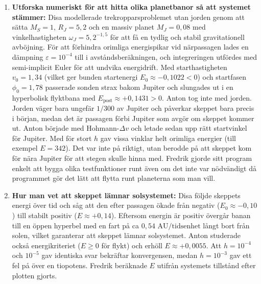 \documentclass{article}
\begin{document}
\begin{enumerate}
    \item \textbf{Utforska numeriskt för att hitta olika planetbanor så att systemet stämmer:} 
    Disa modellerade trekropparsproblemet utan jorden genom att sätta $M_S = 1$, $R_J = 5{,}2$ och en massiv planet $M_J = 0{,}08$ med vinkelhastigheten $\omega_J = 5{,}2^{-1{,}5}$ för att få en tydlig och stabil gravitationell avböjning. För att förhindra orimliga energispikar vid närpassagen lades en dämpning $\varepsilon = 10^{-4}$ till i avståndsberäkningen, och integreringen utfördes med semi-implicit Euler för att undvika energidrift. Med starthastigheten $v_0 = 1{,}34$ (vilket ger bunden startenergi $E_0 \approx -0{,}1022 < 0$) och startfasen $\phi_0 = 1{,}78$ passerade sonden strax bakom Jupiter och slungades ut i en hyperbolisk flyktbana med $E_{\text{post}} \approx +0{,}1431 > 0$. Anton tog inte med jorden. Jorden väger bara ungefär $1/300$ av Jupiter och påverkar skeppet bara precis i början, medan det är passagen förbi Jupiter som avgör om skeppet kommer ut. Anton började med Hohmann-$\Delta v$ och letade sedan upp rätt startvinkel för Jupiter. Med för stort $h$ gav vissa vinklar helt orimliga energier (till exempel $E = 342$). Det var inte på riktigt, utan berodde på att skeppet kom för nära Jupiter för att stegen skulle hinna med. Fredrik gjorde sitt program enkelt att bygga olika testfunktioner runt även om det inte var nödvändigt då programmet gör det lätt att flytta runt planeterna som man vill.
    
    \item \textbf{Hur man vet att skeppet lämnar solsystemet:} 
    Disa följde skeppets energi över tid och såg att den efter passagen ökade från negativ ($E_0 \approx -0{,}10$) till stabilt positiv ($E \approx +0{,}14$). Eftersom energin är positiv övergår banan till en öppen hyperbel med en fart på ca $0{,}54\text{ AU/tidsenhet}$ långt bort från solen, vilket garanterar att skeppet lämnar solsystemet. Anton studerade också energikriteriet ($E \ge 0$ för flykt) och erhöll $E \approx +0{,}0055$. Att $h = 10^{-4}$ och $10^{-5}$ gav identiska svar bekräftar konvergensen, medan $h = 10^{-3}$ gav ett fel på över en tiopotens. Fredrik beräknade $E$ utifrån systemets tillstånd efter plotten gjorts. 
\end{enumerate}
\end{document}
